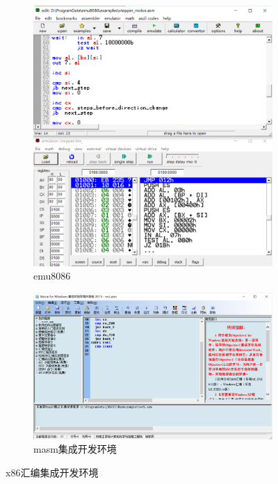\documentclass{ctexart}
\begin{document}
	\begin{figure}[htpb]
		\centering
		\begin{subfigure}[htpb]{.45\linewidth}
			\centering
			\includegraphics[width=\linewidth]{emu8086.png}
			\caption{emu8086}
			\label{fig:emu8086}
		\end{subfigure}
		\quad
		\begin{subfigure}[htpb]{.45\linewidth}
			\centering
			\includegraphics[width=\linewidth]{masmIDE.png}
			\caption{masm集成开发环境}
			\label{fig:masm集成开发环境}
		\end{subfigure}
		\caption{x86汇编集成开发环境}
		\label{fig:x86汇编集成开发环境}
	\end{figure}
\end{document}
